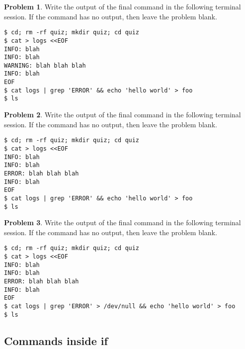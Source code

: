 \documentclass[10pt]{article}
\theoremstyle{definition}
\newtheorem{problem}{Problem}
\begin{document}
\filbreak
\begin{problem}
    Write the output of the final command in the following terminal session.
    If the command has no output, then leave the problem blank.
\end{problem}
\begin{lstlisting}
$ cd; rm -rf quiz; mkdir quiz; cd quiz
$ cat > logs <<EOF
INFO: blah
INFO: blah
WARNING: blah blah blah
INFO: blah
EOF
$ cat logs | grep 'ERROR' && echo 'hello world' > foo
$ ls
\end{lstlisting}

\filbreak
\begin{problem}
    Write the output of the final command in the following terminal session.
    If the command has no output, then leave the problem blank.
\end{problem}
\begin{lstlisting}
$ cd; rm -rf quiz; mkdir quiz; cd quiz
$ cat > logs <<EOF
INFO: blah
INFO: blah
ERROR: blah blah blah
INFO: blah
EOF
$ cat logs | grep 'ERROR' && echo 'hello world' > foo
$ ls
\end{lstlisting}


\filbreak
\begin{problem}
    Write the output of the final command in the following terminal session.
    If the command has no output, then leave the problem blank.
\end{problem}
\begin{lstlisting}
$ cd; rm -rf quiz; mkdir quiz; cd quiz
$ cat > logs <<EOF
INFO: blah
INFO: blah
ERROR: blah blah blah
INFO: blah
EOF
$ cat logs | grep 'ERROR' > /dev/null && echo 'hello world' > foo
$ ls
\end{lstlisting}
\subsection{Commands inside if}

\end{document}
